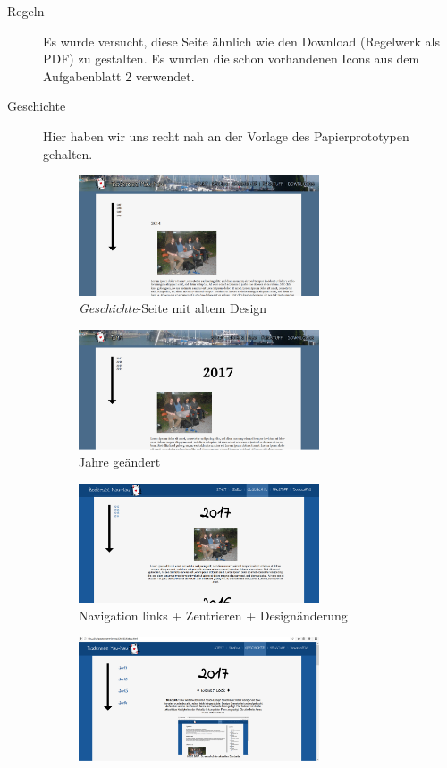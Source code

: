\documentclass{scrartcl}
\begin{document}
\begin{enumerate}
\begin{description}
\item[Regeln]
Es wurde versucht, diese Seite ähnlich wie den Download (Regelwerk als PDF) zu gestalten. Es wurden die schon vorhandenen Icons aus dem Aufgabenblatt 2 verwendet.
\item[Geschichte] Hier haben wir uns recht nah an der Vorlage des Papierprototypen gehalten. \\
\begin{figure}[H]
 \centering
   \includegraphics[width=0.7\textwidth]{geschichte.png}
\caption{\textit{Geschichte}-Seite mit altem Design}
\end{figure}
\begin{figure}[H]
 \centering
   \includegraphics[width=0.7\textwidth]{geschichte2.png}
\caption{Jahre geändert}
\end{figure}
\begin{figure}[H]
 \centering
   \includegraphics[width=0.7\textwidth]{geschichte3.png}
\caption{Navigation links + Zentrieren + Designänderung}
\end{figure}
\begin{figure}[H]
 \centering
   \includegraphics[width=0.7\textwidth]{geschichte4.png}

\end{figure}
\end{description}
\end{enumerate}
\end{document}
